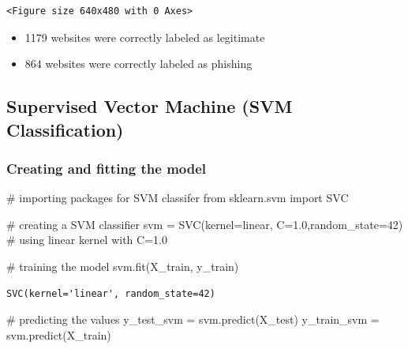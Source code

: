 \documentclass[
  letterpaper,
  DIV=11,
  numbers=noendperiod]{scrartcl}
\newenvironment{Shaded}{\begin{snugshade}}{\end{snugshade}}
\newcommand{\CommentTok}[1]{\textcolor[rgb]{0.37,0.37,0.37}{#1}}
\newcommand{\DecValTok}[1]{\textcolor[rgb]{0.68,0.00,0.00}{#1}}
\newcommand{\FloatTok}[1]{\textcolor[rgb]{0.68,0.00,0.00}{#1}}
\newcommand{\ImportTok}[1]{\textcolor[rgb]{0.00,0.46,0.62}{#1}}
\newcommand{\NormalTok}[1]{\textcolor[rgb]{0.00,0.23,0.31}{#1}}
\newcommand{\OperatorTok}[1]{\textcolor[rgb]{0.37,0.37,0.37}{#1}}
\newcommand{\StringTok}[1]{\textcolor[rgb]{0.13,0.47,0.30}{#1}}
\providecommand{\tightlist}{%
  \setlength{\itemsep}{0pt}\setlength{\parskip}{0pt}}\usepackage{longtable,booktabs,array}
\begin{document}
\begin{verbatim}
<Figure size 640x480 with 0 Axes>
\end{verbatim}

\begin{itemize}
\tightlist
\item
  1179 websites were correctly labeled as legitimate
\item
  864 websites were correctly labeled as phishing
\end{itemize}

\hypertarget{supervised-vector-machine-svm-classification}{%
\subsection{Supervised Vector Machine (SVM
Classification)}\label{supervised-vector-machine-svm-classification}}

\hypertarget{creating-and-fitting-the-model}{%
\subsubsection{Creating and fitting the
model}\label{creating-and-fitting-the-model}}

\begin{Shaded}
\begin{Highlighting}[]
\CommentTok{\# importing packages for SVM classifer}
\ImportTok{from}\NormalTok{ sklearn.svm }\ImportTok{import}\NormalTok{ SVC}

\CommentTok{\# creating a SVM classifier}
\NormalTok{svm }\OperatorTok{=}\NormalTok{ SVC(kernel}\OperatorTok{=}\StringTok{\textquotesingle{}linear\textquotesingle{}}\NormalTok{, C}\OperatorTok{=}\FloatTok{1.0}\NormalTok{,random\_state}\OperatorTok{=}\DecValTok{42}\NormalTok{) }\CommentTok{\# using linear kernel with C=1.0}

\CommentTok{\# training the model}
\NormalTok{svm.fit(X\_train, y\_train)}
\end{Highlighting}
\end{Shaded}

\begin{verbatim}
SVC(kernel='linear', random_state=42)
\end{verbatim}

\begin{Shaded}
\begin{Highlighting}[]
\CommentTok{\# predicting the values}
\NormalTok{y\_test\_svm }\OperatorTok{=}\NormalTok{ svm.predict(X\_test)}
\NormalTok{y\_train\_svm }\OperatorTok{=}\NormalTok{ svm.predict(X\_train)}
\end{Highlighting}
\end{Shaded}
\end{document}
